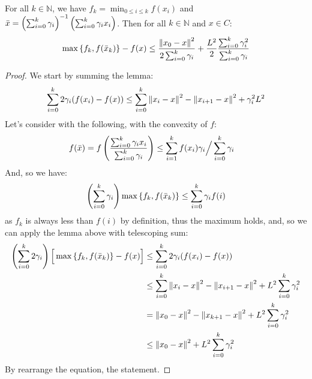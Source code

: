 \begin{theorem}
    For all $k\in \mathbb{N}$, we have $f_k =\min_{0\le i \le k}f(x_i)$ and $\bar{x} = \left( \sum^k_{i=0}\gamma_i \right)^{-1}\left( \sum^k_{i=0}\gamma_ix_i \right)$. Then for all $k\in \mathbb{N}$ and $x \in C$:
    \begin{equation*}
        \max\left\{ f_k, f(\bar{x}_k) \right\} - f(x)\le \frac{\left\lVert x_0-x\right\rVert^2}{2\sum^k_{i=0}\gamma_i} + \frac{L^2}{2}\frac{\sum^k_{i=0}\gamma_i^2}{\sum^k_{i=0}\gamma_i}
    \end{equation*}
\end{theorem}
\begin{proof}
    We start by summing the lemma:
    \begin{equation*}
        \sum^k_{i=0} 2\gamma_i(f(x_i) - f(x)) \le \sum^k_{i=0} \left\lVert x_i-x\right\rVert^2 - \left\lVert x_{i+1}-x\right\rVert^2 + \gamma_i^2L^2
    \end{equation*}
    Let's consider with the following, with the convexity of $f$:
    \begin{equation*}
    \begin{aligned}
        f(\bar{x}) &= f\left( \frac{\sum^k_{i=0}\gamma_ix_i}{\sum^k_{i=0}\gamma_i} \right) \le \sum^k_{i=1}f(x_i)\gamma_i\Big/\sum^k_{i=0}\gamma_i
    \end{aligned}
    \end{equation*}
    And, so we have:
    \begin{equation*}
        \left( \sum^k_{i=0}\gamma_i \right) \max\left\{  f_k, f(\bar{x}_k)  \right\} \le \sum^k_{i=0}\gamma_i f(i)
    \end{equation*}
    as $f_k$ is always less than $f(i)$ by definition, thus the maximum holds, and, so we can apply the lemma above with telescoping sum: 
    \begin{equation*}
    \begin{aligned} 
        \left( \sum^k_{i=0}2\gamma_i \right) \Big[\max\left\{  f_k, f(\bar{x}_k)  \right\}- f(x) \Big] &\le \sum^k_{i=0} 2\gamma_i(f(x_i) - f(x)) \\
        &\le \sum^k_{i=0} \left\lVert x_i-x\right\rVert^2 - \left\lVert x_{i+1}-x\right\rVert^2 + L^2\sum^k_{i=0}\gamma_i^2 \\
        &= \left\lVert x_0-x\right\rVert^2 - \left\lVert x_{k+1}-x\right\rVert^2 + L^2\sum^k_{i=0}\gamma_i^2 \\
        &\le \left\lVert x_0-x\right\rVert^2  + L^2\sum^k_{i=0}\gamma_i^2 \\
    \end{aligned}
    \end{equation*}
    By rearrange the equation, the statement.
\end{proof}

